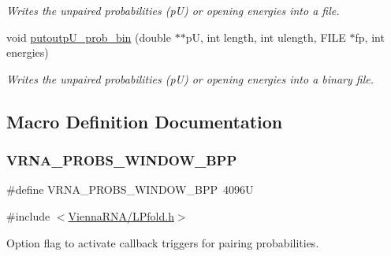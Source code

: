 \begin{DoxyCompactItemize}
\begin{DoxyCompactList}\small\item\em Writes the unpaired probabilities (pU) or opening energies into a file. \end{DoxyCompactList}\item 
void \hyperlink{group__local__pf__fold_ga9acb00ee10e96b1ca4ea394cd8bcec75}{putoutp\+U\+\_\+prob\+\_\+bin} (double $\ast$$\ast$pU, int length, int ulength, F\+I\+LE $\ast$fp, int energies)
\begin{DoxyCompactList}\small\item\em Writes the unpaired probabilities (pU) or opening energies into a binary file. \end{DoxyCompactList}\end{DoxyCompactItemize}


\subsection{Macro Definition Documentation}
\mbox{\label{group__local__pf__fold_ga296217b76e76e5f7e6927e7210aa9b1f}} 
\subsubsection{\texorpdfstring{V\+R\+N\+A\+\_\+\+P\+R\+O\+B\+S\+\_\+\+W\+I\+N\+D\+O\+W\+\_\+\+B\+PP}{VRNA\_PROBS\_WINDOW\_BPP}}
{\footnotesize\ttfamily \#define V\+R\+N\+A\+\_\+\+P\+R\+O\+B\+S\+\_\+\+W\+I\+N\+D\+O\+W\+\_\+\+B\+PP~4096U}



{\ttfamily \#include $<$\hyperlink{LPfold_8h}{Vienna\+R\+N\+A/\+L\+Pfold.\+h}$>$}



Option flag to activate callback triggers for pairing probabilities. 

